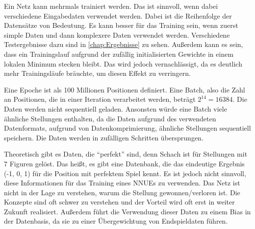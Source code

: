 Ein Netz kann mehrmals trainiert werden. Das ist sinnvoll, wenn dabei verschiedene Eingabedaten verwendet werden. Dabei ist die Reihenfolge der Datensätze von Bedeutung. Es kann besser für das Training sein, wenn zuerst simple Daten und dann komplexere Daten verwendet werden. Verschiedene Testergebnisse dazu sind in \autoref{chap:Ergebnisse} zu sehen. Außerdem kann es sein, dass ein Trainingslauf aufgrund der zufällig initialisierten Gewichte in einem lokalen Minimum stecken bleibt. Das wird jedoch vernachlässigt, da es deutlich mehr Trainingsläufe bräuchte, um diesen Effekt zu verringern.

Eine Epoche ist als 100 Millionen Positionen definiert. Eine Batch, also die Zahl an Positionen, die in einer Iteration verarbeitet werden, beträgt $2^{14}=16384$. Die Daten werden nicht sequentiell geladen. Ansonsten würde eine Batch viele ähnliche Stellungen enthalten, da die Daten aufgrund des verwendeten Datenformats, aufgrund von Datenkomprimierung, ähnliche Stellungen sequentiell speichern. Die Daten werden in zufälligen Schritten übersprungen.




Theoretisch gibt es Daten, die \enquote{perfekt} sind, denn Schach ist für Stellungen mit 7 Figuren gelöst. Das heißt, es gibt eine Datenbank, die das eindeutige Ergebnis (-1, 0, 1) für die Position mit perfektem Spiel kennt. Es ist jedoch nicht sinnvoll, diese Informationen für das Training eines \acp{NNUE} zu verwenden. Das Netz ist nicht in der Lage zu verstehen, warum die Stellung gewonnen/verloren ist. Die Konzepte sind oft schwer zu verstehen und der Vorteil wird oft erst in weiter Zukunft realisiert. Außerdem führt die Verwendung dieser Daten zu einem Bias in der Datenbasis, da sie zu einer Übergewichtung von Endspieldaten führen.


